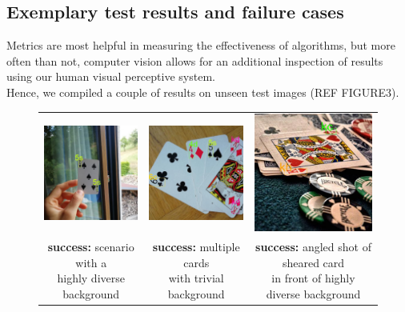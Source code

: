 \documentclass[a4paper]{article}
\begin{document}
\subsection*{Exemplary test results and failure cases}
Metrics are most helpful in measuring the effectiveness of algorithms, but more often than not, computer vision allows for an additional inspection of results using our human visual perceptive system. \\Hence, we compiled a couple of results on unseen test images (REF FIGURE3).
\begin{figure}[h]

\begin{tabular}{ccc}

 \includegraphics[width=44mm]{success3} &   \includegraphics[width=44mm]{success2} &   \includegraphics[width=44mm]{success1}\\
\makecell{\textbf{success:} scenario with a \\ highly diverse background}  & \makecell{\textbf{success:}  multiple cards \\ with trivial background} & \makecell{\textbf{success:}  angled shot of sheared card \\ in front of highly diverse background}\\[6pt]

\end{tabular}
\end{figure}
\end{document}
